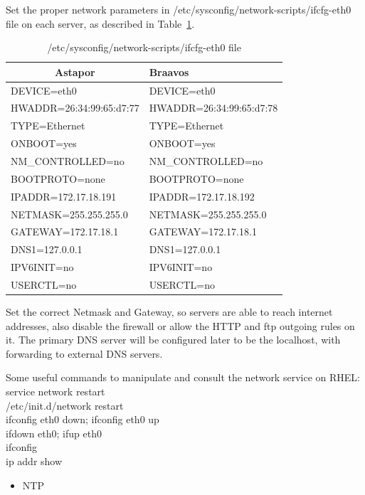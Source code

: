 \documentclass[a4paper, 12pt]{book}
\begin{document}
\noindent Set the proper network parameters in /etc/sysconfig/network-scripts/ifcfg-eth0 file on each server, as described in Table~\ref{table:ifcfg}.

\FloatBarrier
\begin{table}[H]
  \centering
  \begin{tabular}{ | l | l | }
    \hline
    \multicolumn{1}{|c|}{Astapor} & Braavos \\
    \hline
    DEVICE=eth0 & DEVICE=eth0 \\
    HWADDR=26:34:99:65:d7:77 & HWADDR=26:34:99:65:d7:78\\
    TYPE=Ethernet & TYPE=Ethernet\\
    ONBOOT=yes & ONBOOT=yes\\
    NM\_CONTROLLED=no & NM\_CONTROLLED=no\\
    BOOTPROTO=none & BOOTPROTO=none\\
    IPADDR=172.17.18.191 & IPADDR=172.17.18.192\\
    NETMASK=255.255.255.0 & NETMASK=255.255.255.0\\
    GATEWAY=172.17.18.1	& GATEWAY=172.17.18.1\\
	DNS1=127.0.0.1 & DNS1=127.0.0.1\\
	IPV6INIT=no & IPV6INIT=no\\
	USERCTL=no & USERCTL=no\\
    \hline
  \end{tabular}
\caption{/etc/sysconfig/network-scripts/ifcfg-eth0 file}
\label{table:ifcfg}
\end{table}


\noindent Set the correct Netmask and Gateway, so servers are able to reach internet addresses, also disable the firewall or allow the HTTP and ftp outgoing rules on it. The primary DNS server will be configured later to be the localhost, with forwarding to external DNS servers.\bigskip

\noindent Some useful commands to manipulate and consult the network service on RHEL:\\
\indent service network restart\\
\indent /etc/init.d/network restart\\
\indent ifconfig eth0 down; ifconfig eth0 up\\
\indent ifdown eth0; ifup eth0\\
\indent ifconfig\\
\indent ip addr show

\begin{itemize}
	\item NTP
\end{itemize}
\end{document}

